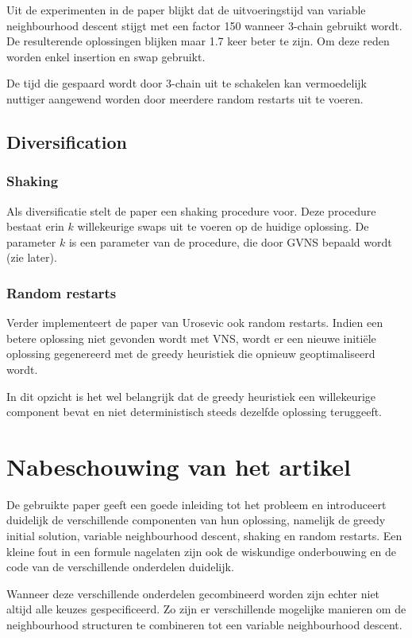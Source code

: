 \documentclass[pdftex,12pt,a4paper]{article}
\begin{document}
Uit de experimenten in de paper blijkt dat de uitvoeringstijd van variable neighbourhood descent stijgt met een factor 150 wanneer 3-chain gebruikt wordt. 
De resulterende oplossingen blijken maar 1.7 keer beter te zijn.
Om deze reden worden enkel insertion en swap gebruikt. 

De tijd die gespaard wordt door 3-chain uit te schakelen kan vermoedelijk nuttiger aangewend worden door meerdere random restarts uit te voeren.

\subsection{Diversification}
\subsubsection{Shaking}
Als diversificatie stelt de paper een shaking procedure voor.
Deze procedure bestaat erin $k$ willekeurige swaps uit te voeren op de huidige oplossing. 
De parameter $k$ is een parameter van de procedure, die door GVNS bepaald wordt (zie later).

\subsubsection{Random restarts}
Verder implementeert de paper van Urosevic\cite{Urosevic} ook random restarts. Indien een betere oplossing niet gevonden wordt met VNS, wordt er een nieuwe initi\"ele oplossing gegenereerd met de greedy heuristiek die opnieuw geoptimaliseerd wordt.

In dit opzicht is het wel belangrijk dat de greedy heuristiek een willekeurige component bevat en niet deterministisch steeds dezelfde oplossing teruggeeft.

\section{Nabeschouwing van het artikel}
De gebruikte paper geeft een goede inleiding tot het probleem en introduceert duidelijk de verschillende componenten van hun oplossing, namelijk de greedy initial solution, variable neighbourhood descent, shaking en random restarts.
Een kleine fout in een formule nagelaten zijn ook de wiskundige onderbouwing en de code van de verschillende onderdelen duidelijk.

Wanneer deze verschillende onderdelen gecombineerd worden zijn echter niet altijd alle keuzes gespecificeerd.
Zo zijn er verschillende mogelijke manieren om de neighbourhood structuren te combineren tot een variable neighbourhood descent.
\end{document}
